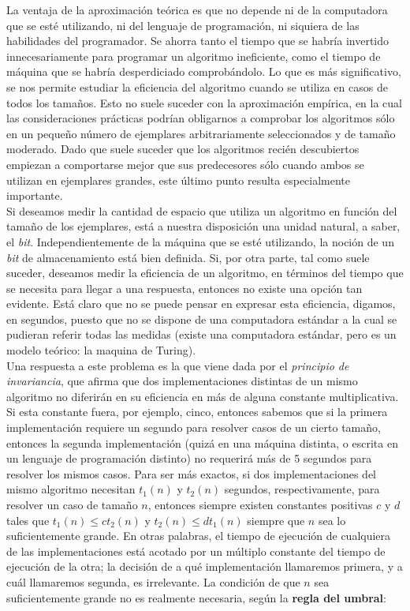 La ventaja de la aproximación teórica es que no depende ni de la computadora que se esté utilizando, ni del lenguaje de programación, ni siquiera de las habilidades del programador. Se ahorra tanto el tiempo que se habría invertido innecesariamente para programar un algoritmo ineficiente, como el tiempo de máquina que se habría desperdiciado comprobándolo. Lo que es más significativo, se nos permite estudiar la eficiencia del algoritmo cuando se utiliza en casos de todos los tamaños. Esto no suele suceder con la aproximación empírica, en la cual las consideraciones prácticas podrían obligarnos a comprobar los algoritmos sólo en un pequeño número de ejemplares arbitrariamente seleccionados y de tamaño moderado. Dado que suele suceder que los algoritmos recién descubiertos empiezan a comportarse mejor que sus predecesores sólo cuando ambos se utilizan en ejemplares grandes, este último punto resulta especialmente importante. \\

Si deseamos medir la cantidad de espacio que utiliza un algoritmo en función del tamaño de los ejemplares, está a nuestra disposición una unidad natural, a saber, el \emph{bit}. Independientemente de la máquina que se esté utilizando, la noción de un \emph{bit} de almacenamiento está bien definida. Si, por otra parte, tal como suele suceder, deseamos medir la eficiencia de un algoritmo, en términos del tiempo que se necesita para llegar a una respuesta, entonces no existe una opción tan evidente. Está claro que no se puede pensar en expresar esta eficiencia, digamos, en segundos, puesto que no se dispone de una computadora estándar a la cual se pudieran referir todas las medidas (existe una computadora estándar, pero es un modelo teórico: la maquina de Turing).\\

Una respuesta a este problema es la que viene dada por el \emph{principio de invariancia}, que afirma que dos implementaciones distintas de un mismo algoritmo no diferirán en su eficiencia en más de alguna constante multiplicativa. Si esta constante fuera, por ejemplo, cinco, entonces sabemos que si la primera implementación requiere un segundo para resolver casos de un cierto tamaño, entonces la segunda implementación (quizá en una máquina distinta, o escrita en un lenguaje de programación distinto) no requerirá más de 5 segundos para resolver los mismos casos. Para ser más exactos, si dos implementaciones del mismo algoritmo necesitan $t_1(n)$ y $t_2(n)$ segundos, respectivamente, para resolver un caso de tamaño $n$, entonces siempre existen constantes positivas $c$ y $d$ tales que $t_1(n) \leq ct_2(n)$ y $t_2(n) \leq dt_1(n)$ siempre que $n$ sea lo suficientemente grande. En otras palabras, el tiempo de ejecución de cualquiera de las implementaciones está acotado por un múltiplo constante del tiempo de ejecución de la otra; la decisión de a qué implementación llamaremos primera, y a cuál llamaremos segunda, es irrelevante. La condición de que $n$ sea suficientemente grande no es realmente necesaria, según la \textbf{regla del umbral}:\\

